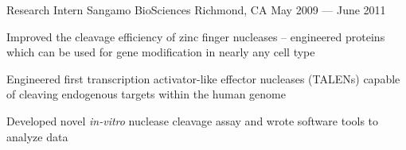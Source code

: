 

\begin{cventries}

  \cventry
  {Research Intern} %
  {Sangamo BioSciences} %
  {Richmond, CA} %
  {May 2009 --- June 2011} %
  {
    \begin{cvitems} %
    \item {Improved the cleavage efficiency of zinc finger nucleases – engineered proteins which can be used for gene modification in nearly any cell type}
    \item {Engineered first transcription activator-like effector nucleases (TALENs) capable of cleaving endogenous targets within the human genome}
    \item {Developed novel {\em in-vitro} nuclease cleavage assay and wrote software tools to analyze data}
    \end{cvitems}
  }


\end{cventries}
